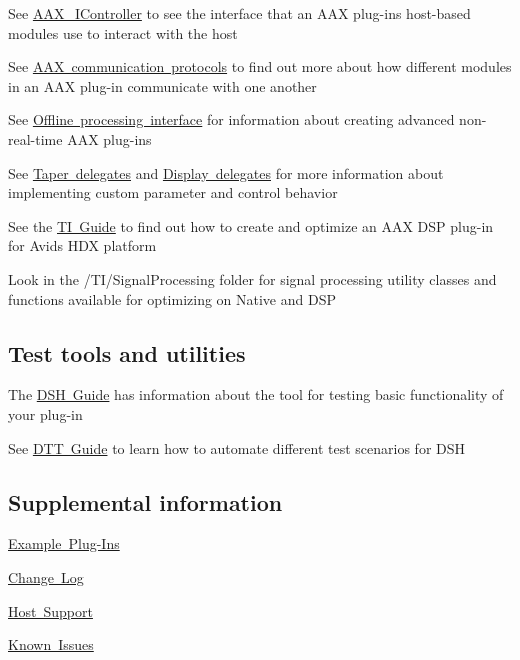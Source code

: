 \begin{DoxyItemize}
\item See \mbox{\hyperlink{a01789}{A\+A\+X\+\_\+\+I\+Controller}} to see the interface that an A\+AX plug-\/in\textquotesingle{}s host-\/based modules use to interact with the host \item See \mbox{\hyperlink{a00800}{A\+AX communication protocols}} to find out more about how different modules in an A\+AX plug-\/in communicate with one another \item See \mbox{\hyperlink{a00804}{Offline processing interface}} for information about creating advanced non-\/real-\/time A\+AX plug-\/ins \item See \mbox{\hyperlink{a00815}{Taper delegates}} and \mbox{\hyperlink{a00816}{Display delegates}} for more information about implementing custom parameter and control behavior \item See the \mbox{\hyperlink{a00832}{TI Guide}} to find out how to create and optimize an A\+AX D\+SP plug-\/in for Avid\textquotesingle{}s H\+DX platform \item Look in the /\+T\+I/\+Signal\+Processing folder for signal processing utility classes and functions available for optimizing on Native and D\+SP\end{DoxyItemize}
\hypertarget{a00793_welcome_testtools}{}\subsection{Test tools and utilities}\label{a00793_welcome_testtools}
\begin{DoxyItemize}
\item The \mbox{\hyperlink{a00835}{D\+SH Guide}} has information about the tool for testing basic functionality of your plug-\/in \item See \mbox{\hyperlink{a00836}{D\+TT Guide}} to learn how to automate different test scenarios for D\+SH\end{DoxyItemize}
\hypertarget{a00793_welcome_supplemental}{}\subsection{Supplemental information}\label{a00793_welcome_supplemental}
\begin{DoxyItemize}
\item \mbox{\hyperlink{a00848}{Example Plug-\/\+Ins}} \item \mbox{\hyperlink{a00847}{Change Log}} \item \mbox{\hyperlink{a00845}{Host Support}} \item \mbox{\hyperlink{a00846}{Known Issues}}\end{DoxyItemize}
